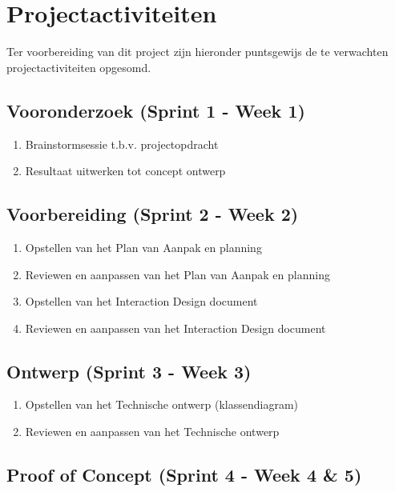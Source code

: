 \chapter{Projectactiviteiten} \label{cha:projectactiviteiten}

Ter voorbereiding van dit project zijn hieronder puntsgewijs de te verwachten projectactiviteiten opgesomd. 

\section{Vooronderzoek (Sprint 1 - Week 1)} \label{subsec:Vooronderzoek (Sprint 1 - Week 1)}

\begin{enumerate}
  \item Brainstormsessie t.b.v. projectopdracht
  \item Resultaat uitwerken tot concept ontwerp
\end{enumerate}

\section{Voorbereiding (Sprint 2 - Week 2)} \label{subsec:Voorbereiding (Sprint 2 - Week 2)}

\begin{enumerate}
  \item Opstellen van het Plan van Aanpak en planning
  \item Reviewen en aanpassen van het Plan van Aanpak en planning
  \item Opstellen van het Interaction Design document
  \item Reviewen en aanpassen van het Interaction Design document
\end{enumerate}

\section{Ontwerp (Sprint 3 - Week 3)} \label{subsec:Ontwerp (Sprint 3 - Week 3)}

\begin{enumerate}
  \item Opstellen van het Technische ontwerp (klassendiagram)
  \item Reviewen en aanpassen van het Technische ontwerp
\end{enumerate}

\section{Proof of Concept (Sprint 4 - Week 4 & 5)} \label{subsec:Proof of Concept (Sprint 4 - Week 4 & 5)}

